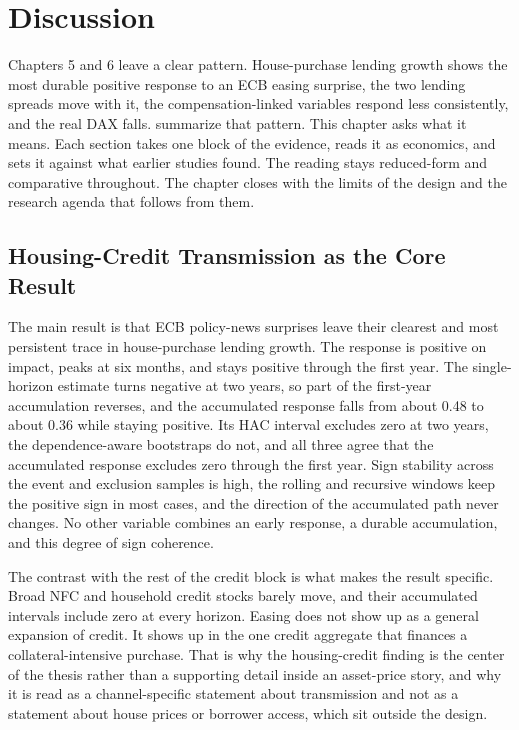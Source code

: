 \chapter{Discussion}
\label{chap:discussion}

Chapters 5 and 6 leave a clear pattern. House-purchase lending growth shows the most durable positive response to an ECB easing surprise, the two lending spreads move with it, the compensation-linked variables respond less consistently, and the real DAX falls.  summarize that pattern. This chapter asks what it means. Each section takes one block of the evidence, reads it as economics, and sets it against what earlier studies found. The reading stays reduced-form and comparative throughout. The chapter closes with the limits of the design and the research agenda that follows from them.

\section{Housing-Credit Transmission as the Core Result}

The main result is that ECB policy-news surprises leave their clearest and most persistent trace in house-purchase lending growth. The response is positive on impact, peaks at six months, and stays positive through the first year. The single-horizon estimate turns negative at two years, so part of the first-year accumulation reverses, and the accumulated response falls from about 0.48 to about 0.36 while staying positive. Its HAC interval excludes zero at two years, the dependence-aware bootstraps do not, and all three agree that the accumulated response excludes zero through the first year. Sign stability across the event and exclusion samples is high, the rolling and recursive windows keep the positive sign in most cases, and the direction of the accumulated path never changes. No other variable combines an early response, a durable accumulation, and this degree of sign coherence.

The contrast with the rest of the credit block is what makes the result specific. Broad NFC and household credit stocks barely move, and their accumulated intervals include zero at every horizon. Easing does not show up as a general expansion of credit. It shows up in the one credit aggregate that finances a collateral-intensive purchase. That is why the housing-credit finding is the center of the thesis rather than a supporting detail inside an asset-price story, and why it is read as a channel-specific statement about transmission and not as a statement about house prices or borrower access, which sit outside the design.

